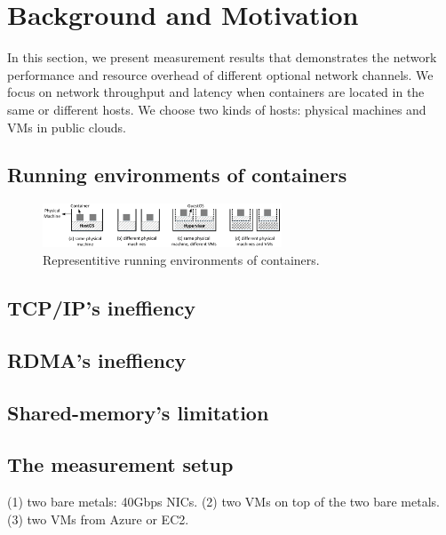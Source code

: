 \section{Background and Motivation}
\label{sec:motivation}

In this section, we present measurement results that demonstrates the network performance and resource overhead of different optional network channels. We focus on network throughput and latency when containers are located in the same or different hosts. 
We choose two kinds of hosts: physical machines and VMs in public clouds.

\subsection{Running environments of containers}

\begin{figure}[t!] 
     \centering 
     \includegraphics[width=2.8in]{figures/deployment-cases} 
    \caption{\label{fig:deploy-cases} Representitive running environments of containers.} 
\end{figure} 

\subsection{TCP/IP's ineffiency}

\subsection{RDMA's ineffiency}

\subsection{Shared-memory's limitation}



\subsection{The measurement setup}
(1) two bare metals: 40Gbps NICs.
(2) two VMs on top of the two bare metals.
(3) two VMs from Azure or EC2.

